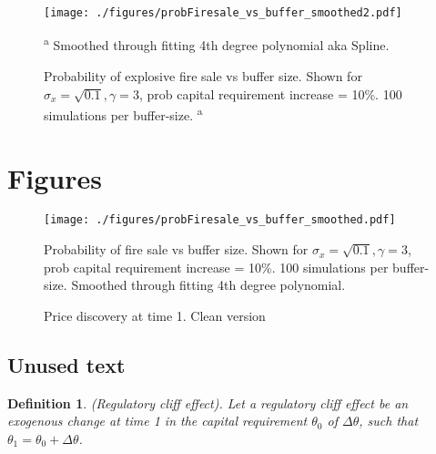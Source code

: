 \documentclass[11pt]{article}
\newtheorem{definition}{Definition}%
\begin{document}
\begin{appendices}
\begin{figure}[h]
\centering
\texttt{[image: ./figures/probFiresale\_vs\_buffer\_smoothed2.pdf]}
\caption{Probability of explosive fire sale vs buffer size. Shown for $\sigma_x = \sqrt{0.1}, \gamma = 3$, prob capital requirement increase = 10\%. 100 simulations per buffer-size.\textsuperscript{\color{blue} a}}
{\small\textsuperscript{{\color{blue} a}} Smoothed through fitting 4th degree polynomial aka Spline.}
\label{f_probFSvsBuffer}
\end{figure}


\iffalse
\section{Figures}

\begin{figure}[h]
\centering
\texttt{[image: ./figures/probFiresale\_vs\_buffer\_smoothed.pdf]}
\caption{Probability of fire sale vs buffer size. Shown for $\sigma_x = \sqrt{0.1}, \gamma = 3$, prob capital requirement increase = 10\%. 100 simulations per buffer-size. Smoothed through fitting 4th degree polynomial.}
\label{f_probFSvsBufferAppendix}
\end{figure}

\begin{figure}[h]
\centering
{}
\caption{Price discovery at time 1. Clean version}
\label{fig:t1pricediscClean}
\end{figure}

\newpage
\subsection{Unused text}

\begin{definition} (Regulatory cliff effect).
Let a regulatory cliff effect be an exogenous change at time 1 in the capital requirement $\theta_0$ of $\Delta \theta$, such that $\theta_1 = \theta_0 + \Delta \theta$. 
\end{definition}


\end{appendices}
\end{document}

